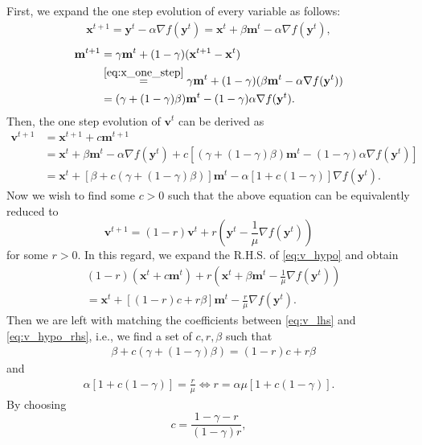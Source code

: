 \documentclass{article}
\theoremstyle{plain}
\theoremstyle{definition}
\theoremstyle{remark}
\def\bx{\mathbf{x}}
\def\by{\mathbf{y}}
\def\bm{\mathbf{m}}
\def\bv{\mathbf{v}}
\begin{document}
First, we expand the one step evolution of every variable as follows:
\begin{align}
    \bx^{t+1} = \by^t - \alpha \nabla f(\by^t) = \bx^t + \beta\bm^t - \alpha \nabla f(\by^t) ,\label{eq:x_one_step}
\end{align}
\begin{align}
    \bm^{t+1} &= \gamma \bm^t + (1-\gamma)(\bx^{t+1} - \bx^t) \\
    &\stackrel{\eqref{eq:x_one_step}}{=}\gamma \bm^t + (1-\gamma)(\beta \bm^t - \alpha \nabla f(\by^t)) \\
    &= (\gamma + (1-\gamma)\beta) \bm^t - (1-\gamma)\alpha \nabla f(\by^t). \label{eq:m_one_step}
\end{align}
Then, the one step evolution of $\bv^t$ can be derived as
\begin{align}
    \bv^{t+1} &= \bx^{t+1} + c\bm^{t+1} \\
    &= \bx^t + \beta\bm^t - \alpha \nabla f(\by^t) + c \left[ (\gamma + (1-\gamma)\beta) \bm^t - (1-\gamma)\alpha \nabla f(\by^t) \right] \\
    &= \bx^t + [\beta + c(\gamma + (1-\gamma)\beta)] \bm^t - \alpha [1 + c(1-\gamma)]\nabla f(\by^t). \label{eq:v_lhs}
\end{align}
Now we wish to find some $c > 0$ such that the above equation can be equivalently reduced to
\begin{equation}
    \bv^{t+1} = (1 - r) \bv^t + r\left(\by^t - \frac{1}{\mu} \nabla f(\by^t) \right) \label{eq:v_hypo}
\end{equation}
for some $r > 0$. In this regard, we expand the R.H.S. of \eqref{eq:v_hypo} and obtain
\begin{align}
&(1 - r) (\bx^t + c \bm^t) + r\left(\bx^t + \beta \bm^t - \frac{1}{\mu} \nabla f(\by^t) \right) \\
&=\bx^t + [(1-r)c + r\beta] \bm^t - \frac{r}{\mu}\nabla f(\by^t). \label{eq:v_hypo_rhs}
\end{align}
Then we are left with matching the coefficients between \eqref{eq:v_lhs} and \eqref{eq:v_hypo_rhs}, i.e., we find a set of $c, r, \beta$ such that
\begin{align}
    &\beta + c(\gamma + (1-\gamma)\beta) = (1-r) c + r\beta \label{eq:m_coe}
\end{align}
and 
\begin{align}
    \alpha [1 + c(1-\gamma)] = \frac{r}{\mu} \Leftrightarrow r = \alpha \mu [1 + c(1-\gamma)] .\label{eq:grad_coe}
\end{align}
By choosing
\begin{equation}
    c = \frac{1-\gamma - r}{(1-\gamma)r}, \label{eq:c_choice}
\end{equation}
\end{document}
